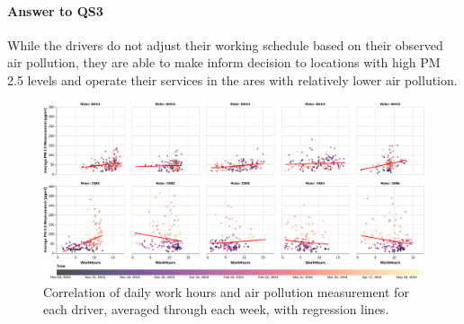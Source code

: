 
\paragraph{Answer to QS3}
While the drivers do not adjust their working schedule based on their observed air pollution, they are able to make inform decision to locations with high PM 2.5 levels and operate their services in the ares with relatively lower air pollution.

\begin{figure}
    \centering
    \includegraphics[width=\textwidth]{figures/work-hours-vs-aqi-per-rider-regression.pdf}
    \caption{Correlation of daily work hours and air pollution measurement for each driver, averaged through each week, with regression lines.
    }
    \Description{}
    \label{fig:work-hours-vs-aqi-per-rider}
\end{figure}

